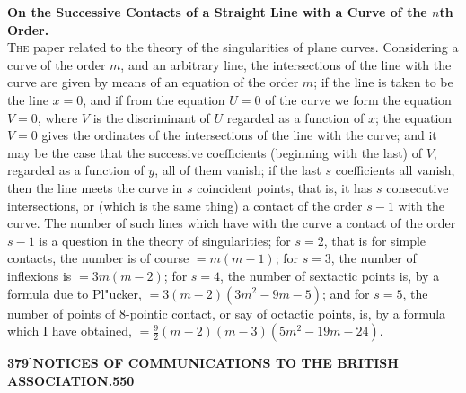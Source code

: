 \documentclass[11pt,a4paper]{article}
\begin{document}
\noindent
\textbf{On the Successive Contacts of a Straight Line with a Curve of the $n$th Order.}\\[4pt]
\noindent
\textsc{The} paper related to the theory of the singularities of plane curves. Considering a curve of the order $m$, and an arbitrary line, the intersections of the line with the curve are given by means of an equation of the order $m$; if the line is taken to be the line $x = 0$, and if from the equation $U = 0$ of the curve we form the equation $V = 0$, where $V$ is the discriminant of $U$ regarded as a function of $x$; the equation $V = 0$ gives the ordinates of the intersections of the line with the curve; and it may be the case that the successive coefficients (beginning with the last) of $V$, regarded as a function of $y$, all of them vanish; if the last $s$ coefficients all vanish, then the line meets the curve in $s$ coincident points, that is, it has $s$ consecutive intersections, or (which is the same thing) a contact of the order $s - 1$ with the curve. The number of such lines which have with the curve a contact of the order $s - 1$ is a question in the theory of singularities; for $s = 2$, that is for simple contacts, the number is of course $= m(m - 1)$; for $s = 3$, the number of inflexions is $= 3m(m - 2)$; for $s = 4$, the number of sextactic points is, by a formula due to Pl"{u}cker, $= 3(m - 2)(3m^{2} - 9m - 5)$; and for $s = 5$, the number of points of 8-pointic contact, or say of octactic points, is, by a formula which I have obtained, $= \tfrac{9}{2}(m - 2)(m - 3)(5m^{2} - 19m - 24)$.

\newpage
\begin{flushright}
\textbf{379]\hspace{1em}NOTICES OF COMMUNICATIONS TO THE BRITISH ASSOCIATION.\hfill550}
\end{flushright}

\vspace{12pt}
\end{document}
